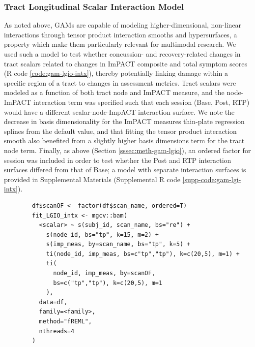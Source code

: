 \documentclass[12pt]{article}
\begin{document}
\subsubsection{Tract Longitudinal Scalar Interaction Model}
\label{sssec:meth-gam-lgio-intx}
As noted above, GAMs are capable of modeling higher-dimensional, non-linear interactions through tensor product interaction smooths and hypersurfaces, a property which make them particularly relevant for multimodal research. We used such a model to test whether concussion- and recovery-related changes in tract scalars related to changes in ImPACT composite and total symptom scores (R code \ref{code:gam-lgio-intx}), thereby potentially linking damage within a specific region of a tract to changes in assessment metrics. Tract scalars were modeled as a function of both tract node and ImPACT measure, and the node-ImPACT interaction term was specified such that each session (Base, Post, RTP) would have a different scalar-node-ImpACT interaction surface. We note the decrease in basis dimensionality for the ImPACT measures thin-plate regression splines from the default value, and that fitting the tensor product interaction smooth also benefited from a slightly higher basis dimensions term for the tract node term. Finally, as above (Section \ref{sssec:meth-gam-lgio}), an ordered factor for session was included in order to test whether the Post and RTP interaction surfaces differed from that of Base; a model with separate interaction surfaces is provided in Supplemental Materials (Supplemental R code \ref{supp-code:gam-lgi-intx}).

\begin{equ}[H]
	\begin{lstlisting}
		df$scanOF <- factor(df$scan_name, ordered=T)
		fit_LGIO_intx <- mgcv::bam(
		  <scalar> ~ s(subj_id, scan_name, bs="re") +
		    s(node_id, bs="tp", k=15, m=2) +
		    s(imp_meas, by=scan_name, bs="tp", k=5) +
		    ti(node_id, imp_meas, bs=c"tp","tp"), k=c(20,5), m=1) +
		    ti(
		      node_id, imp_meas, by=scanOF,
		      bs=c("tp","tp"), k=c(20,5), m=1
		    ),
		  data=df,
		  family=<family>,
		  method="fREML",
		  nthreads=4
		)
	\end{lstlisting}
	\caption{Tract scalars are modeled as a function of separate 1D node and ImPACT smooths as well as a 2D tensor product interaction surface, with ordered factors used to compare Post and RTP surfaces to Base. \lstinline{imp_meas} = ImPACT composite or total symptom measure.}
	\label{code:gam-lgio-intx}
\end{equ}
\end{document}

